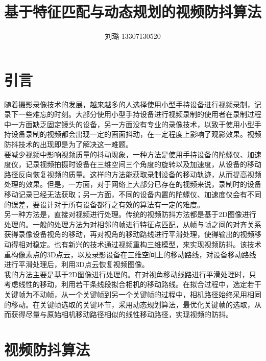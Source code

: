 \documentclass[journal, a4paper]{IEEEtran}
\begin{document}
    \title{基于特征匹配与动态规划的视频防抖算法}
    \author{刘璐 13307130520}
    \maketitle

\section{引言}
    随着摄影录像技术的发展，越来越多的人选择使用小型手持设备进行视频录制，记录下一些难忘的时刻。大部分使用小型手持设备进行视频录制的使用者在录制过程中一方面缺乏固定镜头的设备，另一方面没有专业的录像技术，以致于使用小型手持设备录制的视频都会出现一定的画面抖动，在一定程度上影响了观影效果。视频防抖技术的出现即是为了解决这一难题。 \\
    
    要减少视频中影响视频质量的抖动现象，一种方法是使用手持设备的陀螺仪、加速度仪，记录视频拍摄时设备在三维空间三个角度的旋转以及加速度，从设备的移动路径反向恢复视频的质量。这样的方法能获取录制设备的移动轨迹，从而提高视频处理的效果\cite{GYR1}\cite{GYR2}。但是，一方面，对于网络上大部分已存在的视频来说，录制时的设备移动记录已经无法获取；另一方面，不同的设备内置的陀螺仪、加速度仪会有不同的误差，要设计对于所有设备都行之有效的算法有一定的难度。\\
    
    另一种方法是，直接对视频进行处理。传统的视频防抖方法都是基于2D图像进行处理的。一般的处理方法为对相邻的帧进行特征点匹配，从帧与帧之间的对齐关系获得录像设备视角的移动，再对视角的移动路线进行平滑处理，使得输出的视频移动得相对稳定\cite{L1Opt}。也有新兴的技术通过视频重构三维模型，来实现视频防抖。该技术重构像素点的3D点云，以及录影设备在三维空间上的移动路线，对设备移动路线进行平滑处理后，利用3D点云恢复视频图像\cite{FLiu1}\cite{FLiu2}。 \\
    
    我的方法主要是基于2D图像进行处理的。在对视角移动线路进行平滑处理时，只考虑线性的移动，利用若干条线段拟合相机的移动路线。在拟合过程中，选定若干关键帧为不动帧，从一个关键帧到另一个关键帧的过程中，相机路径始终采用相同的移动。在关键帧选取的关键环节，采用动态规划算法，最优化关键帧的选取，从而获得尽量与原始相机移动路径相似的线性移动路径，实现视频的防抖。

\section{视频防抖算法}
\end{document}
